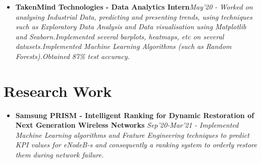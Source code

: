 \documentclass{article}
\begin{document}
\begin{itemize}
    \item{\textbf{\large{TakenMind Technologies - Data Analytics Intern}}}\hfill \textit{May'20}
          \newline
          \textit{- Worked on analysing Industrial Data, predicting and presenting trends, using techniques such as Exploratory Data Analysis and Data visualisation using Matplotlib and Seaborn.Implemented several barplots, heatmaps, etc on several datasets.Implemented Machine Learning Algorithms (such as Random Forests).Obtained 87\% test accuracy.}

\end{itemize}





\section*{Research Work}
\begin{itemize}
    \item{\textbf{\large{Samsung PRISM - Intelligent Ranking for Dynamic Restoration of Next Generation Wireless Networks}}} \hfill \textit{Sep'20-Mar'21}
          \newline
          \textit{- Implemented Machine Learning algorithms and Feature Engineering techniques to predict KPI values for eNodeB-s and consequently a ranking system to orderly restore them during network failure.}
\end{itemize}

\end{document}
